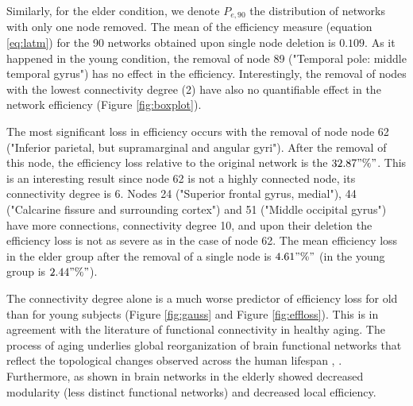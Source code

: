 \documentclass[12pt,a4paper]{article}
\begin{document}
Similarly, for the elder condition, we denote $P_{e, 90}$ the distribution of networks with only one node removed. 
The mean of the efficiency measure (equation \ref{eq:latm}) for the 90 networks obtained upon single node deletion is $0.109$. As it happened in the young condition, the removal of node 89 ("Temporal pole: middle temporal gyrus") has no effect in the efficiency. 
Interestingly, the removal of nodes with the lowest connectivity degree (2) have also no quantifiable effect in the network efficiency (Figure \ref{fig:boxplot}). 

The most significant loss in efficiency occurs with the removal of node node 62 ("Inferior parietal, but supramarginal and angular gyri"). After the removal of this node, the efficiency loss relative to the original network is the $32.87"\%"$. This is an interesting result since node 62 is not a highly connected node, its connectivity degree is 6. Nodes 24 ("Superior frontal gyrus, medial"), 44 ("Calcarine fissure and surrounding cortex") and 51 ("Middle occipital gyrus") have more connections, connectivity degree 10, and upon their deletion the efficiency loss is not as severe as in the case of node 62. 
The mean efficiency loss in the elder group after the removal of a single node is  $4.61"\%"$ (in the young group is $2.44"\%"$). 

The connectivity degree alone is a much worse predictor of efficiency loss for old than for young subjects (Figure \ref{fig:gauss} and Figure \ref{fig:effloss}). This is in agreement with the literature of functional connectivity in healthy aging. The process of aging underlies global reorganization of brain functional networks that reflect the topological changes observed across the human lifespan \citep{cao_topological_2014}, \citep{song_age-related_2014}.  
Furthermore, as shown in \citep{geerligs_brain-wide_2015} brain networks in the elderly showed decreased modularity (less distinct functional networks) and decreased local efficiency.
\end{document}
